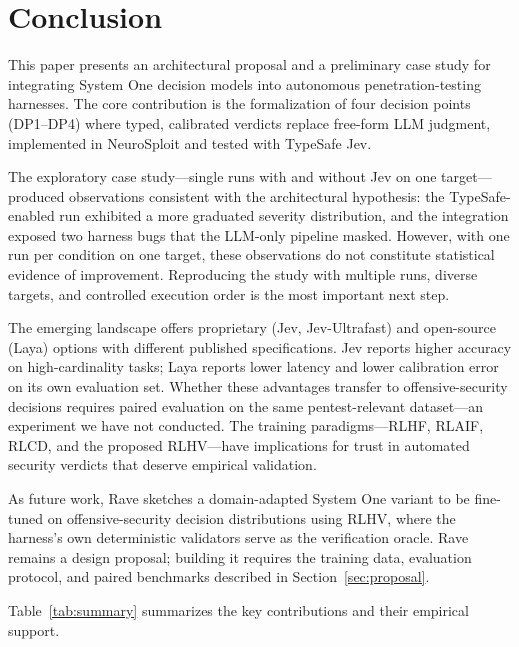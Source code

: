 \documentclass[conference]{IEEEtran}
\begin{document}
\section{Conclusion}\label{sec:conclusion}

This paper presents an architectural proposal and a preliminary case study for integrating System One decision models into autonomous penetration-testing harnesses. The core contribution is the formalization of four decision points (DP1--DP4) where typed, calibrated verdicts replace free-form LLM judgment, implemented in NeuroSploit and tested with TypeSafe Jev.

The exploratory case study---single runs with and without Jev on one target---produced observations consistent with the architectural hypothesis: the TypeSafe-enabled run exhibited a more graduated severity distribution, and the integration exposed two harness bugs that the LLM-only pipeline masked. However, with one run per condition on one target, these observations do not constitute statistical evidence of improvement. Reproducing the study with multiple runs, diverse targets, and controlled execution order is the most important next step.

The emerging landscape offers proprietary (Jev, Jev-Ultrafast) and open-source (Laya) options with different published specifications. Jev reports higher accuracy on high-cardinality tasks; Laya reports lower latency and lower calibration error on its own evaluation set. Whether these advantages transfer to offensive-security decisions requires paired evaluation on the same pentest-relevant dataset---an experiment we have not conducted. The training paradigms---RLHF, RLAIF, RLCD, and the proposed RLHV---have implications for trust in automated security verdicts that deserve empirical validation.

As future work, Rave sketches a domain-adapted System One variant to be fine-tuned on offensive-security decision distributions using RLHV, where the harness's own deterministic validators serve as the verification oracle. Rave remains a design proposal; building it requires the training data, evaluation protocol, and paired benchmarks described in Section~\ref{sec:proposal}.

Table~\ref{tab:summary} summarizes the key contributions and their empirical support.
\end{document}
